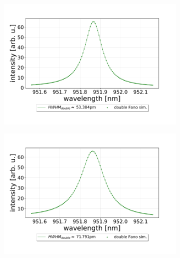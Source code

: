 \begin{figure}[h!]
\begin{subfigure}[b]{0.49\textwidth}
        \caption{}
        \label{fig:120um_M3:M5_sim}
    \end{subfigure}
    \begin{subfigure}[b]{0.49\textwidth}
        \includegraphics[width=\textwidth]{figures/results/double fano fits/70um_M3:M5_simfit.pdf}
        \caption{}
        \label{fig:70um_M3:M5_sim}
    \end{subfigure}
\end{figure}
\begin{figure}[h!] \ContinuedFloat
    \centering
    \begin{subfigure}[b]{0.49\textwidth}
        \includegraphics[width=\textwidth]{figures/results/double fano fits/30um_M3:M5_simfit.pdf}
        \caption{}
        \label{fig:30um_M3:M5_sim}
    \end{subfigure}
\end{figure}


